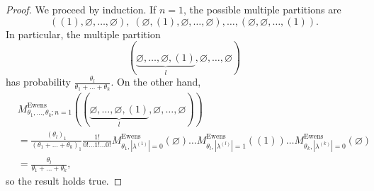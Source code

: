 \documentclass[12pt]{amsart}
\theoremstyle{definition}
\numberwithin{equation}{section}
\DeclareMathOperator{\Ewens}{Ewens}
\begin{document}
\begin{proof}
We proceed by induction. If $n=1$, the possible multiple partitions are
$$
((1),\varnothing,\ldots,\varnothing),\; (\varnothing, (1),\varnothing,\ldots,\varnothing),\ldots,
(\varnothing,\varnothing,\ldots,(1)).
$$
In particular, the multiple partition
$$
\left(\underset{l}{\underbrace{\varnothing,\ldots,\varnothing, (1)}},\varnothing,\ldots,\varnothing\right)
$$
has probability $\frac{\theta_l}{\theta_1+\ldots+\theta_k}$. On the other hand,
\begin{equation}
\begin{split}
&M^{\Ewens}_{\theta_1,\ldots,\theta_k; n=1}\left(\left(\underset{l}{\underbrace{\varnothing,\ldots,\varnothing, (1)}},\varnothing,\ldots,\varnothing\right)
\right)\\
&=\frac{(\theta_l)_1}{(\theta_1+\ldots+\theta_k)_1}
\frac{1!}{0!\ldots 1!\ldots 0!}
M^{\Ewens}_{\theta_1,|\lambda^{(1)}|=0}\left(\varnothing\right)
\ldots
M^{\Ewens}_{\theta_l,|\lambda^{(l)}|=1}\left((1)\right)
\ldots
M^{\Ewens}_{\theta_k,|\lambda^{(k)}|=0}\left(\varnothing\right)\\
&=\frac{\theta_l}{\theta_1+\ldots+\theta_k},
\end{split}
\end{equation}
so the result holds true.


\end{proof}
\end{document}
